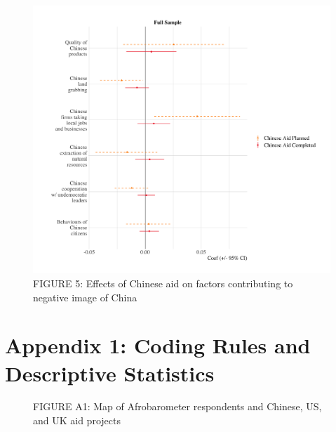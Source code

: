\documentclass[9pt]{article}
\begin{document}
\begin{figure}[H]
\centering
\includegraphics[width=1\textwidth]{figures/figure_05.png}
\caption{FIGURE 5: Effects of Chinese aid on factors contributing to negative image of China}
\end{figure}


\appendix
\section{Appendix 1: Coding Rules and Descriptive Statistics}

\begin{figure}[H]
\centering
\caption{FIGURE A1: Map of Afrobarometer respondents and Chinese, US, and UK aid projects}
\end{figure}
\end{document}
